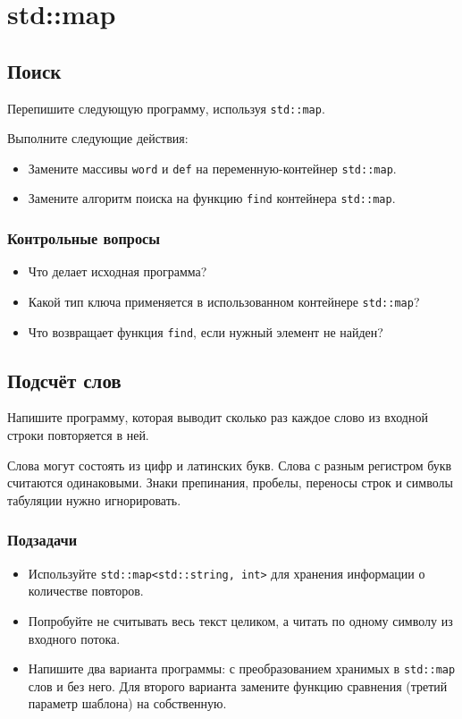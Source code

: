 \documentclass[10pt,twoside,openany]{book}
\begin{document}
\chapter{std::map}

\section{Поиск}

Перепишите следующую программу, используя {\tt std::map}.

Выполните следующие действия:
\begin{itemize}
    \item Замените массивы {\tt word} и {\tt def} на переменную-контейнер {\tt std::map}.
    \item Замените алгоритм поиска на функцию {\tt find} контейнера {\tt std::map}.
\end{itemize}



\subsection*{Контрольные вопросы}

\begin{itemize}
    \item Что делает исходная программа?
    \item Какой тип ключа применяется в использованном контейнере {\tt std::map}?
    \item Что возвращает функция {\tt find}, если нужный элемент не найден?
\end{itemize}

\section{Подсчёт слов}

Напишите программу, которая выводит сколько раз каждое слово из входной строки повторяется в ней.

Слова могут состоять из цифр и латинских букв. Слова с разным регистром букв считаются одинаковыми.
Знаки препинания, пробелы, переносы строк и символы табуляции нужно игнорировать.

\subsection*{Подзадачи}

\begin{itemize}
    \item Используйте {\tt std::map<std::string, int>} для хранения информации о количестве повторов.
    \item Попробуйте не считывать весь текст целиком, а читать по одному символу из входного потока.
    \item Напишите два варианта программы: с преобразованием хранимых в {\tt std::map} слов и без него.
          Для второго варианта замените функцию сравнения (третий параметр шаблона) на собственную.
\end{itemize}
\end{document}
